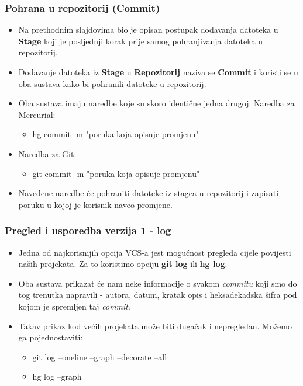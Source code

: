 \documentclass{beamer}
\begin{document}
	\begin{frame}
		\frametitle{Pohrana u repozitorij (Commit)}
 		\begin{itemize}
			\item Na prethodnim slajdovima bio je opisan postupak dodavanja datoteka u \textbf{Stage} koji je posljednji korak prije samog pohranjivanja datoteka u repozitorij.
			\item Dodavanje datoteka iz \textbf{Stage} u \textbf{Repozitorij} naziva se \textbf{Commit} i koristi se u oba sustava kako bi pohranili datoteke u repozitorij.
			\item Oba sustava imaju naredbe koje su skoro identične jedna drugoj. Naredba za Mercurial:
  			\begin{itemize}						
  				\item hg commit -m "poruka koja opisuje promjenu"
			\end{itemize}
			\item Naredba za Git:
			\begin{itemize}						
  				\item git commit -m "poruka koja opisuje promjenu"
			\end{itemize}
			\item Navedene naredbe će pohraniti datoteke iz stagea u repozitorij i zapisati poruku u kojoj je korisnik naveo promjene.
		\end{itemize}
	\end{frame}

	\begin{frame}
		\frametitle{Pregled i usporedba verzija 1 - log}
		\begin{itemize}
			\item Jedna od najkorisnijih opcija VCS-a jest mogućnost pregleda cijele povijesti naših projekata. Za to koristimo opciju \textbf{git log} ili \textbf{hg log}.
			\item Oba sustava prikazat će nam neke informacije o svakom \textit{commitu} koji smo do tog trenutka napravili - autora, datum, kratak opis i heksadekadska šifra pod kojom je spremljen taj \textit{commit}.
			\item Takav prikaz kod većih projekata može biti dugačak i nepregledan. Možemo ga pojednostaviti:
			\begin{itemize}
				\item git log --oneline --graph --decorate --all
				\item hg log --graph
			\end{itemize}
		\end{itemize}
	\end{frame}
\end{document}
